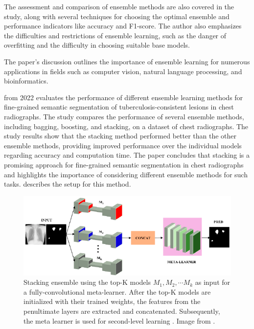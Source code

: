 The assessment and comparison of ensemble methods are also covered in the study, along with several techniques for choosing the optimal ensemble and performance indicators like accuracy and F1-score. The author also emphasizes the difficulties and restrictions of ensemble learning, such as the danger of overfitting and the difficulty in choosing suitable base models.

The paper's discussion outlines the importance of ensemble learning for numerous applications in fields such as computer vision, natural language processing, and bioinformatics.

 \cite{Rajaraman2022-fy} from 2022 evaluates the performance of different ensemble learning methods for fine-grained semantic segmentation of tuberculosis-consistent lesions in chest radiographs. The study compares the performance of several ensemble methods, including bagging, boosting, and stacking, on a dataset of chest radiographs. The study results show that the stacking method performed better than the other ensemble methods, providing improved performance over the individual models regarding accuracy and computation time. The paper concludes that stacking is a promising approach for fine-grained semantic segmentation in chest radiographs and highlights the importance of considering different ensemble methods for such tasks.  describes the setup for this method.

\begin{figure}[H]%
    \centering
    \includegraphics[width=\imgWidthXL]{images/ensemble_tuberculosis.png}
    \caption[Stacking ensemble]{Stacking ensemble using the top-K models $M_1,M_2,\cdots M_k$ as input for a fully-convolutional meta-learner. After the top-K models are initialized with their trained weights, the features from the penultimate layers are extracted and concatenated. Subsequently, the meta learner is used for second-level learning \protect\footnotemark. Image from \cite{Rajaraman2022-fy}.}
    \label{ensemble_tuberculosis}
\end{figure}

